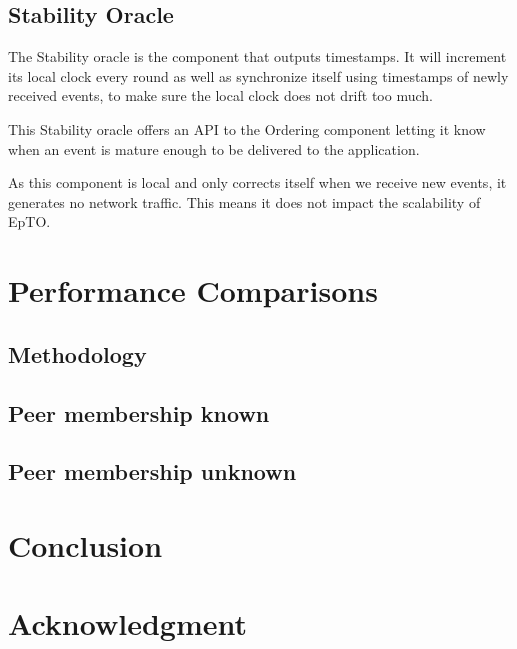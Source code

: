 \documentclass[10pt,conference,a4paper]{IEEEtran}
\begin{document}
\subsection{Stability Oracle}
The Stability oracle is the component that outputs timestamps. It will increment its local clock every round as well as synchronize itself using timestamps of newly received events, to make sure the local clock does not drift too much.
\par
This Stability oracle offers an API to the Ordering component letting it know when an event is mature enough to be delivered to the application.
\par
As this component is local and only corrects itself when we receive new events, it generates no network traffic. This means it does not impact the scalability of EpTO.
\section{Performance Comparisons}
\subsection{Methodology}
\subsection{Peer membership known}
\subsection{Peer membership unknown}

\section{Conclusion}




\section*{Acknowledgment}




\begin{otherlanguage}{australian}
\printbibliography
\end{otherlanguage}

\end{document}
